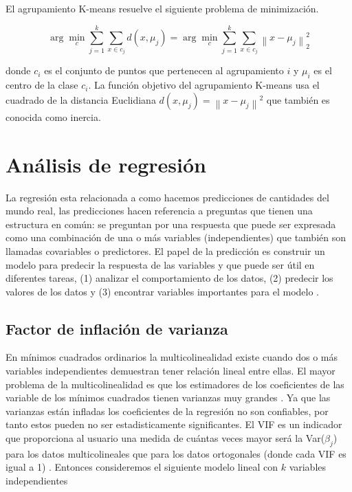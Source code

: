 El agrupamiento K-means resuelve el siguiente problema de minimización. 

\begin{equation}
	\arg \min _{c} \sum_{j=1}^{k} \sum_{x \in c_{j}} d\left(x, \mu_{j}\right)=\arg \min _{c} \sum_{j=1}^{k} \sum_{x \in c_{j}}\left\|x-\mu_{j}\right\|_{2}^{2}
\end{equation}

donde $c_i$ es el conjunto de puntos que pertenecen al agrupamiento $i$ y $\mu_i$ es el centro de la clase $c_i$. La función objetivo del agrupamiento K-means usa el cuadrado de la distancia Euclidiana $d\left(x, \mu_{j}\right)=\left\|x-\mu_{j}\right\|^{2}$ que también es conocida como inercia.


\section{Análisis de regresión}
La regresión esta relacionada a como hacemos predicciones de cantidades del mundo real, las predicciones hacen referencia a preguntas que tienen una estructura en común: se preguntan por una respuesta que puede ser expresada como una combinación de una o más variables (independientes) que también son llamadas covariables o predictores. El papel de la predicción es construir un modelo para predecir la respuesta de las variables y que puede ser útil en diferentes tareas, (1) analizar el comportamiento de los datos, (2) predecir los valores de los datos y (3) encontrar variables importantes para el modelo \parencite{igualIntroductionDataScience2017}.

\subsection{Factor de inflación de varianza}

En mínimos cuadrados ordinarios la multicolinealidad existe cuando dos o más variables independientes demuestran tener relación lineal entre ellas. El mayor problema de la multicolinealidad es que los estimadores de los coeficientes de las variable de los mínimos cuadrados tienen varianzas muy grandes \parencite{mansfieldDetectingMulticollinearity1982}. Ya que las varianzas están infladas los coeficientes de la regresión no son confiables, por tanto
estos pueden no ser estadisticamente significantes.  El VIF es un indicador que proporciona al usuario una medida de cuántas veces mayor será la Var($\beta_j$) para los datos multicolineales que para los datos ortogonales (donde cada VIF es igual a 1) \parencite{mansfieldDetectingMulticollinearity1982}. Entonces consideremos el siguiente modelo lineal con $k$ variables independientes 

